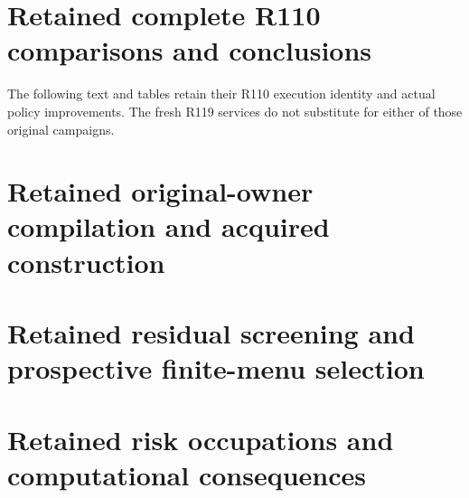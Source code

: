 \documentclass[ecta,nameyear,draft]{econsocart}
\begin{document}
\section{Retained complete R110 comparisons and conclusions}\label{dev:custody110}
The following text and tables retain their R110 execution identity and actual
policy improvements. The fresh R119 services do not substitute for either
of those original campaigns.



\section{Retained original-owner compilation and acquired construction}\label{dev:core110}

\section{Retained residual screening and prospective finite-menu selection}\label{dev:selection110}












\section{Retained risk occupations and computational consequences}\label{sec:riskextensions99}

\end{document}

